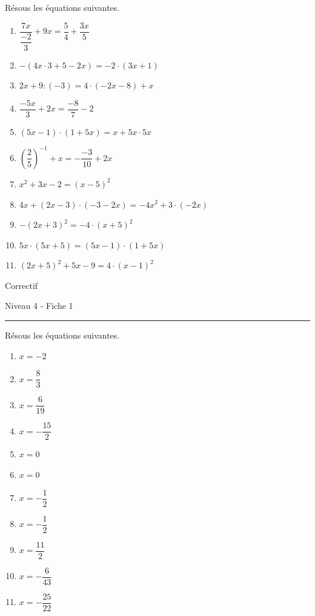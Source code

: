\documentclass[12pt,parskip=half-, twoside=semi]{scrartcl}
\begin{document}
\begin{exercise}
    Résous les équations suivantes.
      \begin{enumerate}[itemsep=0.4cm]
        \item $\dfrac{7 x}{\dfrac{-2}{3}}+9 x=\dfrac{5}{4}+\dfrac{3 x}{5}$
        \item $-(4 x \cdot 3+5-2 x)=-2 \cdot(3 x+1)$
        \item $2 x+9:(-3)=4 \cdot(-2 x-8)+x$
        \item $\dfrac{-5 x}{3}+2 x=\dfrac{-8}{7}-2$
        \item $(5 x-1) \cdot(1+5 x)=x+5 x \cdot 5 x$
        \item $\left(\dfrac{2}{5}\right)^{-1}+x=-\dfrac{-3}{10}+2 x$
        \item $x^2+3 x-2=(x-5)^2$
        \item $4 x+(2 x-3) \cdot(-3-2 x)=-4 x^2+3 \cdot(-2 x)$
        \item $-(2 x+3)^2=-4 \cdot(x+5)^2$
        \item $5 x \cdot(5 x+5)=(5 x-1) \cdot(1+5 x)$
        \item $(2 x+5)^2+5 x-9=4 \cdot(x-1)^2$
      \end{enumerate}
\end{exercise}

\newpage

  
\begin{center}
   \bfseries
    \begin{Huge}
      Correctif
    \end{Huge}
    \smallbreak
    \begin{large}
      Niveau 4  - Fiche 1
    \end{large}
    \smallbreak
    \rule[10pt]{.5\linewidth}{1 pt}
  \end{center}
  \setcounter{exercise}{0}

\begin{exercise}
  Résous les équations suivantes.
    \begin{enumerate}[itemsep=0.4cm]
        \item $x=-2$
        \item $x=\dfrac{8}{3}$
        \item $x=\dfrac{6}{19}$
        \item $x=-\dfrac{15}{2}$
        \item $x=0$
        \item $x=0$
        \item $x=-\dfrac{1}{2}$
        \item $x=-\dfrac{1}{2}$
        \item $x=\dfrac{11}{2}$
        \item $x=-\dfrac{6}{43}$
        \item $x=-\dfrac{25}{22}$
      \end{enumerate}
\end{exercise}
\end{document}
